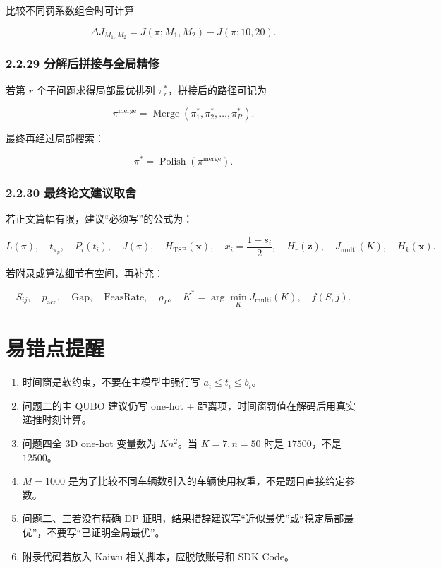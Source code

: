 \documentclass[
  a4paper,
]{ctexart}
\providecommand{\tightlist}{%
  \setlength{\itemsep}{0pt}\setlength{\parskip}{0pt}}
\begin{document}
比较不同罚系数组合时可计算

\[
\Delta J_{M_1,M_2}=J(\pi;M_1,M_2)-J(\pi;10,20).
\]

\subsubsection{2.2.29
分解后拼接与全局精修}\label{ux5206ux89e3ux540eux62fcux63a5ux4e0eux5168ux5c40ux7cbeux4fee}

若第 \(r\) 个子问题求得局部最优排列 \(\pi_r^*\)，拼接后的路径可记为

\[
\pi^{\mathrm{merge}}=\operatorname{Merge}(\pi_1^*,\pi_2^*,\ldots,\pi_R^*).
\]

最终再经过局部搜索：

\[
\pi^*=\operatorname{Polish}\left(\pi^{\mathrm{merge}}\right).
\]

\subsubsection{2.2.30
最终论文建议取舍}\label{ux6700ux7ec8ux8bbaux6587ux5efaux8baeux53d6ux820d}

若正文篇幅有限，建议``必须写''的公式为：

\[
L(\pi),\quad t_{\pi_p},\quad P_i(t_i),\quad J(\pi),\quad H_{\mathrm{TSP}}(\mathbf{x}),\quad x_i=\frac{1+s_i}{2},\quad H_r(\mathbf{z}),\quad J_{\mathrm{multi}}(K),\quad H_k(\mathbf{x}).
\]

若附录或算法细节有空间，再补充：

\[
S_{ij},\quad p_{\mathrm{acc}},\quad \mathrm{Gap},\quad \mathrm{FeasRate},\quad \rho_P,\quad K^*=\arg\min_K J_{\mathrm{multi}}(K),\quad f(S,j).
\]

\section{易错点提醒}\label{ux6613ux9519ux70b9ux63d0ux9192}

\begin{enumerate}
\def\labelenumi{\arabic{enumi}.}
\tightlist
\item
  时间窗是软约束，不要在主模型中强行写 \(a_i\le t_i\le b_i\)。
\item
  问题二的主 QUBO 建议仍写 one-hot +
  距离项，时间窗罚值在解码后用真实递推时刻计算。
\item
  问题四全 3D one-hot 变量数为 \(Kn^2\)。当 \(K=7,n=50\) 时是
  \(17500\)，不是 \(12500\)。
\item
  \(M=1000\)
  是为了比较不同车辆数引入的车辆使用权重，不是题目直接给定参数。
\item
  问题二、三若没有精确 DP
  证明，结果措辞建议写``近似最优''或``稳定局部最优''，不要写``已证明全局最优''。
\item
  附录代码若放入 Kaiwu 相关脚本，应脱敏账号和 SDK Code。
\end{enumerate}
\end{document}
